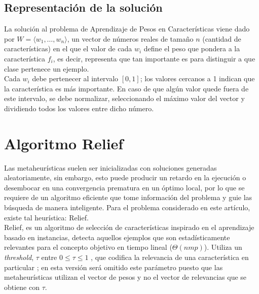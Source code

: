 \documentclass{ci5652}
\begin{document}
\subsection{Representación de la solución}

La solución al problema de Aprendizaje de Pesos en Características viene dado
por $W = \langle w_1, \dots, w_n\rangle$, un vector de números reales de tamaño
$n$ (cantidad de características) en el que el valor de cada $w_i$  define el
peso que pondera a la  característica $f_i$, es decir, representa que tan
importante es para distinguir a que clase pertenece un ejemplo.\\

Cada $w_i$ debe pertenecer al intervalo $[0,1]$; los valores cercanos a 1 indican
que la característica es más importante. En caso de que algún valor quede fuera
de este intervalo, se debe normalizar, seleccionando el máximo valor del vector
y dividiendo todos los valores entre dicho número.

\section{Algoritmo Relief}

Las metaheurísticas suelen ser inicializadas con soluciones generadas
aleatoriamente, sin embargo, esto puede producir un retardo en la ejecución o
desembocar en una convergencia prematura en un óptimo local, por lo que se
requiere de un algoritmo eficiente que tome información del problema y guie las
búsqueda de manera inteligente. Para el problema considerado en este artículo,
existe tal heurística: Relief.\\

Relief, es un algoritmo de selección de características inspirado en el
aprendizaje basado en instancias, detecta aquellos ejemplos que son
estadísticamente relevantes para el concepto objetivo en tiempo lineal
($\Theta(nmp)$). Utiliza un \textit{threshold}, $\tau$ entre
$0 \leq \tau \leq 1$ , que codifica la relevancia de una característica en
particular \cite{Kira_1992};  en esta versión será omitido este parámetro puesto
que las metaheurísticas utilizan el vector de pesos y no el vector de
relevancias que se obtiene con $\tau$.\\
\end{document}
